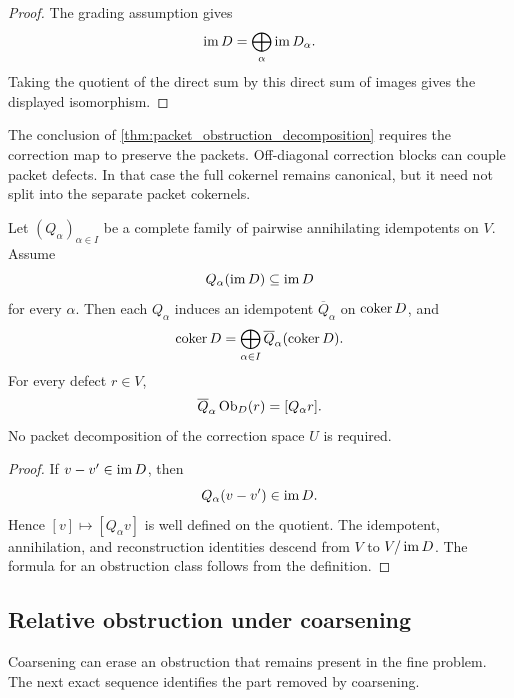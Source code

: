 \begin{proof}
The grading assumption gives
\[
\operatorname{im} D=\bigoplus_\alpha\operatorname{im} D_\alpha.
\]
Taking the quotient of the direct sum by this direct sum of images gives the displayed isomorphism.
\end{proof}

\begin{remark}\label{rem:block_diagonal_needed}
The conclusion of \cref{thm:packet_obstruction_decomposition} requires the correction map to preserve the packets.  Off-diagonal correction blocks can couple packet defects.  In that case the full cokernel remains canonical, but it need not split into the separate packet cokernels.
\end{remark}

\begin{proposition}\label{prop:obstruction_quotient_projectors}
Let $(Q_\alpha)_{\alpha\in I}$ be a complete family of pairwise annihilating idempotents on $V$.  Assume
\[
Q_\alpha(\operatorname{im} D)\subseteq\operatorname{im} D
\]
for every $\alpha$.  Then each $Q_\alpha$ induces an idempotent $\overline Q_\alpha$ on $\operatorname{coker} D$, and
\[
\operatorname{coker} D
=
\bigoplus_{\alpha\in I}\overline Q_\alpha(\operatorname{coker} D).
\]
For every defect $r\in V$,
\[
\overline Q_\alpha\operatorname{Ob}_D(r)
=
[Q_\alpha r].
\]
No packet decomposition of the correction space $U$ is required.
\end{proposition}

\begin{proof}
If $v-v'\in\operatorname{im} D$, then
\[
Q_\alpha(v-v')\in\operatorname{im} D.
\]
Hence $[v]\mapsto[Q_\alpha v]$ is well defined on the quotient.  The idempotent, annihilation, and reconstruction identities descend from $V$ to $V/\operatorname{im} D$.  The formula for an obstruction class follows from the definition.
\end{proof}

\subsection{Relative obstruction under coarsening}

Coarsening can erase an obstruction that remains present in the fine problem.  The next exact sequence identifies the part removed by coarsening.

